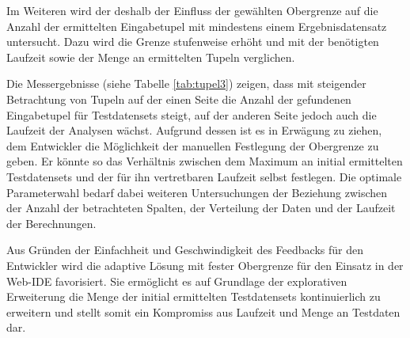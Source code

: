 Im Weiteren wird der deshalb der Einfluss der gewählten Obergrenze auf die Anzahl der ermittelten Eingabetupel mit mindestens einem Ergebnisdatensatz untersucht.
Dazu wird die Grenze stufenweise erhöht und mit der benötigten Laufzeit sowie der Menge an ermittelten Tupeln verglichen.

Die Messergebnisse (siehe Tabelle \ref{tab:tupel3}) zeigen, dass mit steigender Betrachtung von Tupeln auf der einen Seite die Anzahl der gefundenen Eingabetupel für Testdatensets steigt, auf der anderen Seite jedoch auch die Laufzeit der Analysen wächst.
Aufgrund dessen ist es in Erwägung zu ziehen, dem Entwickler die Möglichkeit der manuellen Festlegung der Obergrenze zu geben.
Er könnte so das Verhältnis zwischen dem Maximum an initial ermittelten Testdatensets und der für ihn vertretbaren Laufzeit selbst festlegen.
Die optimale Parameterwahl bedarf dabei weiteren Untersuchungen der Beziehung zwischen der Anzahl der betrachteten Spalten, der Verteilung der Daten und der Laufzeit der Berechnungen.

\begin{table}[b]
	\centering
	\caption{Auswirkung der Wahl der Obergrenze auf Eingabetupel und Laufzeit}
	\label{tab:tupel3}
\end{table}

Aus Gründen der Einfachheit und Geschwindigkeit des Feedbacks für den Entwickler wird die adaptive Lösung mit fester Obergrenze für den Einsatz in der Web-IDE favorisiert.
Sie ermöglicht es auf Grundlage der explorativen Erweiterung die Menge der initial ermittelten Testdatensets kontinuierlich zu erweitern und stellt somit ein Kompromiss aus Laufzeit und Menge an Testdaten dar.







